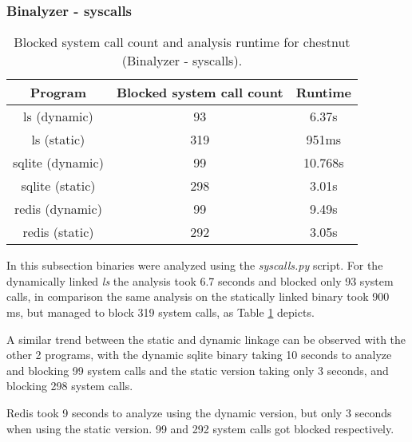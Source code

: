 \subsubsection {Binalyzer - syscalls}
\begin{table}[!h]
\begin{center}
\caption{Blocked system call count and analysis runtime for chestnut (Binalyzer - syscalls).}
\label{tbl:chestnut_bin_sys_results}
\begin{tabular}{||c c c||} 
 \hline
 Program & Blocked system call count & Runtime \\
 \hline\hline
 ls (dynamic) & 93 & 6.37s \\ 
 \hline
 ls (static) & 319 & 951ms \\ 
 \hline
 sqlite (dynamic) & 99 & 10.768s \\ 
 \hline
 sqlite (static) & 298 & 3.01s \\ 
 \hline
 redis (dynamic) & 99 & 9.49s \\ 
 \hline
 redis (static) & 292 & 3.05s \\ 
 \hline
\end{tabular}
\end{center}
\end{table}
In this subsection binaries were analyzed using the \textit{syscalls.py} script.
For the dynamically linked \textit{ls} the analysis took 6.7 seconds and blocked only 93 system calls, in comparison the same analysis on the statically linked binary took 900 ms, but managed to block 319 system calls, as Table \ref{tbl:chestnut_bin_sys_results} depicts.

A similar trend between the static and dynamic linkage can be observed with the other 2 programs, with the dynamic sqlite binary taking 10 seconds to analyze and blocking 99 system calls and the static version taking only 3 seconds, and blocking 298 system calls.

Redis took 9 seconds to analyze using the dynamic version, but only 3 seconds when using the static version. 99 and 292 system calls got blocked respectively.

